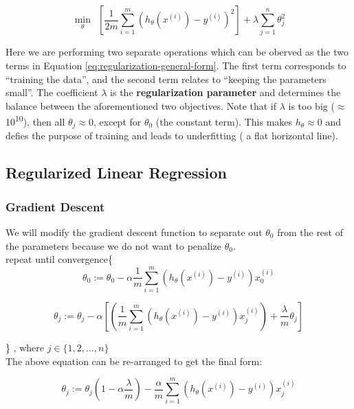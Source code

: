             \begin{equation}
                \min_\theta \:\:[ \frac{1}{2m} \sum_{i=1}^{m} ( h_\theta (x^{(i)}) - y^{(i)} )^2 ] + \lambda \sum_{j=1}^{n} \theta_j^2
                \label{eq:regularization-general-form}
            \end{equation}

            Here we are performing two separate operations which can be oberved as the two terms in Equation \ref{eq:regularization-general-form}. The first term corresponds to ``training the data'', and the second term relates to ``keeping the parameters small''. The coefficient $\lambda$ is the \textbf{regularization parameter} and determines the balance between the aforementioned two objectives. Note that if $\lambda$ is too big ($\approx$ 10\textsuperscript{10}), then all $\theta_j \approx 0$, except for $\theta_0$ (the constant term). This makes $h_\theta \approx 0$ and defies the purpose of training and leads to underfitting ( a flat horizontal line).




    \subsection{Regularized Linear Regression}
    \subsubsection{Gradient Descent} 
        We will modify the gradient descent function to separate out $\theta_0$ from the rest of the parameters because we do not want to penalize $\theta_0$.\\

        repeat until convergence\{  
            \[ \theta_0 := \theta_0 - \alpha \frac{1}{m} \sum_{i=1}^{m} ( h_\theta (x^{(i)}) - y^{(i)}) x_0^{(i)}\] 

            \[
                \theta_j := \theta_j - \alpha [ ( \frac{1}{m} \sum_{i=1}^{m} ( h_\theta (x^{(i)}) - y^{(i)}) x_j^{(i)} ) + \frac{\lambda}{m}\theta_j]
            \] 

        \} , where $j\in \{1, 2, \ldots, n\}$ \\

        The above equation can be re-arranged to get the final form:

        \begin{equation}
            \boxed{
            \theta_j := \theta_j (1-\alpha \frac{\lambda}{m}) - \frac{\alpha}{m} \sum_{i=1}^{m} ( h_\theta (x^{(i)}) - y^{(i)}) x_j^{(i)}
        }
            \label{eq:regularized-gradient-descent}
        \end{equation}

